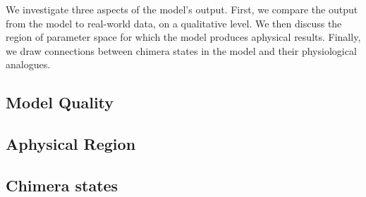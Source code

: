 We investigate three aspects of the model's output.
First, we compare the output from the model to real-world data, on a qualitative level.
We then discuss the region of parameter space for which the model produces aphysical results.
Finally, we draw connections between chimera states in the model and their physiological analogues.
\subsection{Model Quality}
\label{sec:results_model}


\subsection{Aphysical Region}
\label{sec:results_aphysical}


\subsection{Chimera states}
\label{sec:results_chimera}

